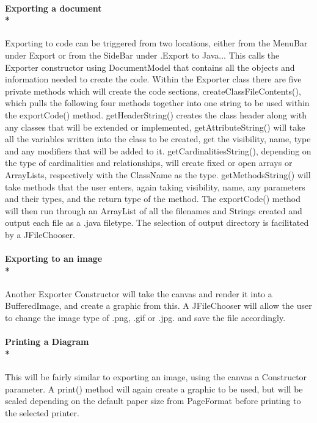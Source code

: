 \paragraph{\small{\tab Exporting a document\\*}}

\hspace{-10pt}Exporting to code can be triggered from two locations, either from the MenuBar under Export or from the SideBar under .Export to Java... This calls the Exporter constructor using DocumentModel that contains all the objects and information needed to create the code. Within the Exporter class there are five private methods which will create the code sections, createClassFileContents(), which pulls the following four methods together into one string to be used within the exportCode() method. getHeaderString() creates the class header along with any classes that will be extended or implemented, getAttributeString() will take all the variables written into the class to be created, get the visibility, name, type and any modifiers that will be added to it. getCardinalitiesString(),  depending on the type of cardinalities and relationships, will create fixed or open arrays or ArrayLists, respectively with the ClassName as the type. getMethodsString() will take methods that the user enters, again taking visibility, name, any parameters and their types, and the return type of the method. The exportCode() method will then run through an ArrayList of all the filenames and Strings created and output each file as a .java filetype. The selection of output directory is facilitated by a JFileChooser.

\paragraph{\small{\tab Exporting to an image\\*}}

\hspace{-10pt}Another Exporter Constructor will take the canvas and render it into a BufferedImage, and create a graphic from this. A JFileChooser will allow the user to change the image type of .png, .gif or .jpg. and save the file accordingly.

\paragraph{\small{\tab Printing a Diagram\\*}}

\hspace{-10pt} This will be fairly similar to exporting an image, using the canvas a Constructor parameter. A print() method will again create a graphic to be used, but will be scaled depending on the default paper size from PageFormat before printing to the selected printer.

